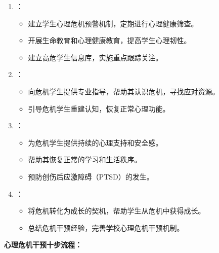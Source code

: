 \begin{keybox}
\begin{enumerate}[leftmargin=*]
    \item {}：
    \begin{itemize}
        \item 建立学生心理危机预警机制，定期进行心理健康筛查。
        \item 开展生命教育和心理健康教育，提高学生心理韧性。
        \item 建立高危学生信息库，实施重点跟踪关注。
    \end{itemize}
    \item {}：
    \begin{itemize}
        \item 向危机学生提供专业指导，帮助其认识危机，寻找应对资源。
        \item 引导危机学生重建认知，恢复正常心理功能。
    \end{itemize}
    \item {}：
    \begin{itemize}
        \item 为危机学生提供持续的心理支持和安全感。
        \item 帮助其恢复正常的学习和生活秩序。
        \item 预防创伤后应激障碍（PTSD）的发生。
    \end{itemize}
    \item {}：
    \begin{itemize}
        \item 将危机转化为成长的契机，帮助学生从危机中获得成长。
        \item 总结危机干预经验，完善学校心理危机干预机制。
    \end{itemize}
\end{enumerate}

\textbf{心理危机干预十步流程：}


\end{keybox}
